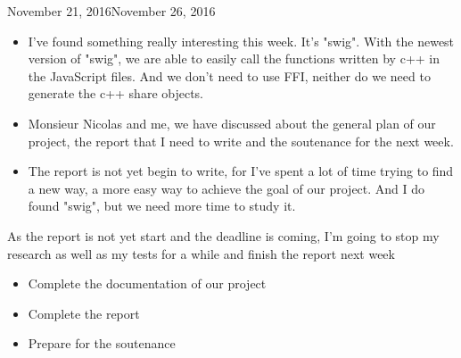 \begin{fichesuivi}{November 21, 2016}{November 26, 2016}

   \begin{travaileffectue}
        \begin{itemize}
            \item I've found something really interesting this week. It's "swig". With the newest version of "swig", we are able to easily call the functions written by c++ in the JavaScript files. And we don't need to use FFI, neither do we need to generate the c++ share objects.
            \item Monsieur Nicolas and me, we have discussed about the general plan of our project, the report that I need to write and the soutenance for the next week.
        \end{itemize}
   \end{travaileffectue}

   \begin{travailnoneffectue}
        \begin{itemize}
            \item The report is not yet begin to write, for I've spent a lot of time trying to find a new way, a more easy way to achieve the goal of our project. And I do found "swig", but we need more time to study it.
        \end{itemize}
   \end{travailnoneffectue}

   \begin{planification}
        As the report is not yet start and the deadline is coming, I'm going to stop my research as well as my tests for a while and finish the report next week
        \begin{itemize}
            \item Complete the documentation of our project 
            \item Complete the report
            \item Prepare for the soutenance
        \end{itemize}
   \end{planification}
\end{fichesuivi}
 







